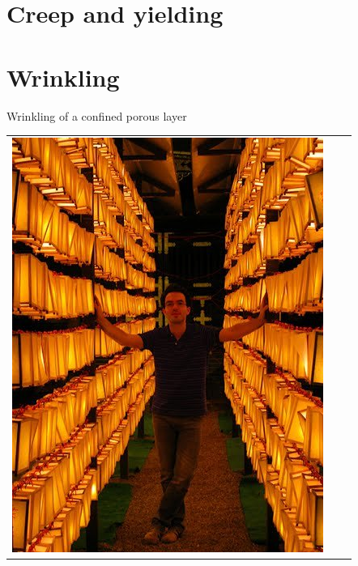 \documentclass[xcolor=table]{beamer}
\begin{document}
\section*{Creep and yielding}




\section*{Wrinkling}

\begin{frame}{Wrinkling of a confined porous layer}

\bigskip
{}

\bigskip
\begin{tabu}{X[c]X[c]c}
\includegraphics[height=0.3\textheight,clip=true,trim=3cm 7cm  2cm 5cm]{Mathieu}&

\end{tabu}
\end{frame}
\end{document}
